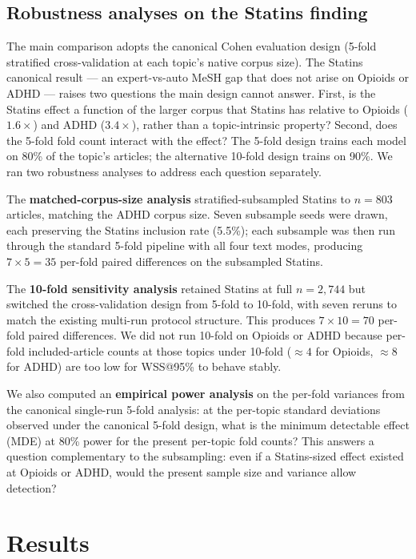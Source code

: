 \documentclass{article}
\begin{document}
\subsection{Robustness analyses on the Statins finding}\label{sec:robustness}

The main comparison adopts the canonical Cohen evaluation design (5-fold stratified cross-validation at each topic's native corpus size). The Statins canonical result --- an expert-vs-auto MeSH gap that does not arise on Opioids or ADHD --- raises two questions the main design cannot answer. First, is the Statins effect a function of the larger corpus that Statins has relative to Opioids ($1.6\times$) and ADHD ($3.4\times$), rather than a topic-intrinsic property? Second, does the 5-fold fold count interact with the effect? The 5-fold design trains each model on 80\% of the topic's articles; the alternative 10-fold design trains on 90\%. We ran two robustness analyses to address each question separately.

The \textbf{matched-corpus-size analysis} stratified-subsampled Statins to $n=803$ articles, matching the ADHD corpus size. Seven subsample seeds were drawn, each preserving the Statins inclusion rate (5.5\%); each subsample was then run through the standard 5-fold pipeline with all four text modes, producing $7 \times 5 = 35$ per-fold paired differences on the subsampled Statins.

The \textbf{10-fold sensitivity analysis} retained Statins at full $n = 2{,}744$ but switched the cross-validation design from 5-fold to 10-fold, with seven reruns to match the existing multi-run protocol structure. This produces $7 \times 10 = 70$ per-fold paired differences. We did not run 10-fold on Opioids or ADHD because per-fold included-article counts at those topics under 10-fold ($\approx 4$ for Opioids, $\approx 8$ for ADHD) are too low for WSS@95\% to behave stably.

We also computed an \textbf{empirical power analysis} on the per-fold variances from the canonical single-run 5-fold analysis: at the per-topic standard deviations observed under the canonical 5-fold design, what is the minimum detectable effect (MDE) at 80\% power for the present per-topic fold counts? This answers a question complementary to the subsampling: even if a Statins-sized effect existed at Opioids or ADHD, would the present sample size and variance allow detection?

\section{Results}
\end{document}
